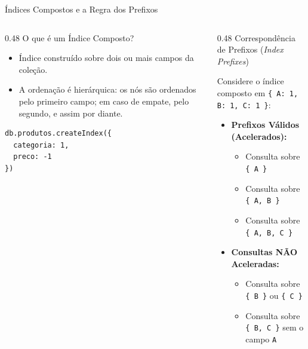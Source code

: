 \begin{frame}[fragile]{Índices Compostos e a Regra dos Prefixos}
  \vspace{0.05cm}
  \begin{columns}[t]
    \begin{column}{0.48\textwidth}
      \alert{O que é um Índice Composto?}\par
      \scriptsize
      \begin{itemize}
        \item Índice construído sobre dois ou mais campos da coleção.
        \item A ordenação é hierárquica: os nós são ordenados pelo primeiro campo; em caso de empate, pelo segundo, e assim por diante.
      \end{itemize}
      \begin{lstlisting}[language=mongosh]
db.produtos.createIndex({
  categoria: 1,
  preco: -1
})
      \end{lstlisting}
    \end{column}
    \begin{column}{0.48\textwidth}
      \alert{Correspondência de Prefixos (\textit{Index Prefixes})}\par
      \scriptsize
      Considere o índice composto em \texttt{\{ A: 1, B: 1, C: 1 \}}:
      \begin{itemize}
        \item \textbf{Prefixos Válidos (Acelerados):}
          \begin{itemize}\scriptsize
            \item Consulta sobre \texttt{\{ A \}}
            \item Consulta sobre \texttt{\{ A, B \}}
            \item Consulta sobre \texttt{\{ A, B, C \}}
          \end{itemize}
        \item \textbf{Consultas NÃO Aceleradas:}
          \begin{itemize}\scriptsize
            \item Consulta sobre \texttt{\{ B \}} ou \texttt{\{ C \}}
            \item Consulta sobre \texttt{\{ B, C \}} sem o campo \texttt{A}
          \end{itemize}
      \end{itemize}
    \end{column}
  \end{columns}
\end{frame}

